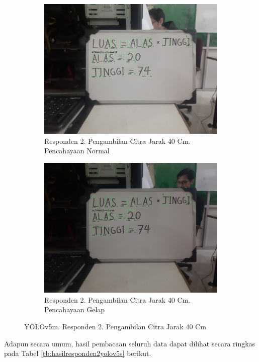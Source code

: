 \begin{figure}[H]
  \begin{subfigure}{.5\textwidth}
    \centering
    \captionsetup{width=.8\linewidth}
    \includegraphics[width=.8\linewidth]{gambar/yolov5m/responden2/ghiyas40cm00-result.jpg}
    \caption{Responden 2. Pengambilan Citra Jarak 40 Cm. Pencahayaan Normal}
    \label{fig:mr2tcitra40cm}
  \end{subfigure}%
  \begin{subfigure}{.5\textwidth}
    \centering
    \captionsetup{width=.8\linewidth}
    \includegraphics[width=.8\linewidth]{gambar/yolov5m/responden2/ghiyas40cm10-result.jpg}
    \caption{Responden 2. Pengambilan Citra Jarak 40 Cm. Pencahayaan Gelap}
    \label{fig:mr2gcitra40cm}
  \end{subfigure}
  \caption{YOLOv5m. Responden 2. Pengambilan Citra Jarak 40 Cm}
  \label{fig:mr2citra40cm}
\end{figure}

Adapun secara umum, hasil pembacaan seluruh data dapat dilihat secara ringkas pada Tabel \ref*{tb:hasilresponden2yolov5s} berikut.

